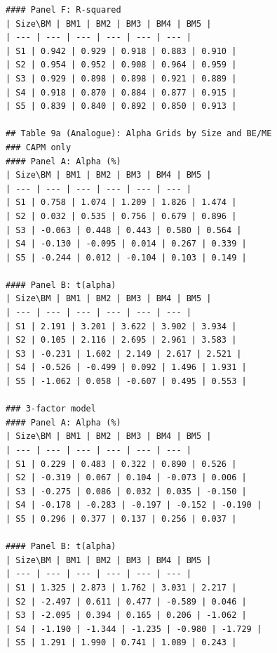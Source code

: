 \begin{verbatim}
#### Panel F: R-squared
| Size\BM | BM1 | BM2 | BM3 | BM4 | BM5 |
| --- | --- | --- | --- | --- | --- |
| S1 | 0.942 | 0.929 | 0.918 | 0.883 | 0.910 |
| S2 | 0.954 | 0.952 | 0.908 | 0.964 | 0.959 |
| S3 | 0.929 | 0.898 | 0.898 | 0.921 | 0.889 |
| S4 | 0.918 | 0.870 | 0.884 | 0.877 | 0.915 |
| S5 | 0.839 | 0.840 | 0.892 | 0.850 | 0.913 |

## Table 9a (Analogue): Alpha Grids by Size and BE/ME
### CAPM only
#### Panel A: Alpha (%)
| Size\BM | BM1 | BM2 | BM3 | BM4 | BM5 |
| --- | --- | --- | --- | --- | --- |
| S1 | 0.758 | 1.074 | 1.209 | 1.826 | 1.474 |
| S2 | 0.032 | 0.535 | 0.756 | 0.679 | 0.896 |
| S3 | -0.063 | 0.448 | 0.443 | 0.580 | 0.564 |
| S4 | -0.130 | -0.095 | 0.014 | 0.267 | 0.339 |
| S5 | -0.244 | 0.012 | -0.104 | 0.103 | 0.149 |

#### Panel B: t(alpha)
| Size\BM | BM1 | BM2 | BM3 | BM4 | BM5 |
| --- | --- | --- | --- | --- | --- |
| S1 | 2.191 | 3.201 | 3.622 | 3.902 | 3.934 |
| S2 | 0.105 | 2.116 | 2.695 | 2.961 | 3.583 |
| S3 | -0.231 | 1.602 | 2.149 | 2.617 | 2.521 |
| S4 | -0.526 | -0.499 | 0.092 | 1.496 | 1.931 |
| S5 | -1.062 | 0.058 | -0.607 | 0.495 | 0.553 |

### 3-factor model
#### Panel A: Alpha (%)
| Size\BM | BM1 | BM2 | BM3 | BM4 | BM5 |
| --- | --- | --- | --- | --- | --- |
| S1 | 0.229 | 0.483 | 0.322 | 0.890 | 0.526 |
| S2 | -0.319 | 0.067 | 0.104 | -0.073 | 0.006 |
| S3 | -0.275 | 0.086 | 0.032 | 0.035 | -0.150 |
| S4 | -0.178 | -0.283 | -0.197 | -0.152 | -0.190 |
| S5 | 0.296 | 0.377 | 0.137 | 0.256 | 0.037 |

#### Panel B: t(alpha)
| Size\BM | BM1 | BM2 | BM3 | BM4 | BM5 |
| --- | --- | --- | --- | --- | --- |
| S1 | 1.325 | 2.873 | 1.762 | 3.031 | 2.217 |
| S2 | -2.497 | 0.611 | 0.477 | -0.589 | 0.046 |
| S3 | -2.095 | 0.394 | 0.165 | 0.206 | -1.062 |
| S4 | -1.190 | -1.344 | -1.235 | -0.980 | -1.729 |
| S5 | 1.291 | 1.990 | 0.741 | 1.089 | 0.243 |

\end{verbatim}
